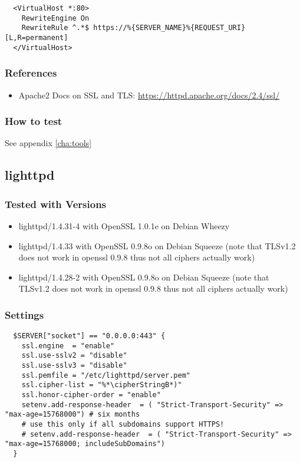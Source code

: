 \begin{lstlisting}
  <VirtualHost *:80>
    RewriteEngine On
    RewriteRule ^.*$ https://%{SERVER_NAME}%{REQUEST_URI} [L,R=permanent]
  </VirtualHost>
\end{lstlisting}

\subsubsection{References}
\begin{itemize}
  \item Apache2 Docs on SSL and TLS: \url{https://httpd.apache.org/docs/2.4/ssl/}
\end{itemize}

\subsubsection{How to test}

See appendix \ref{cha:tools}

\subsection{lighttpd}


\subsubsection{Tested with Versions}
\begin{itemize}
  \item lighttpd/1.4.31-4 with OpenSSL 1.0.1e on Debian Wheezy
  \item lighttpd/1.4.33 with OpenSSL 0.9.8o on Debian Squeeze (note that TLSv1.2 does not work in openssl 0.9.8 thus not all ciphers actually work)
  \item lighttpd/1.4.28-2 with OpenSSL 0.9.8o on Debian Squeeze (note that TLSv1.2 does not work in openssl 0.9.8 thus not all ciphers actually work)
\end{itemize}


\subsubsection{Settings}
\begin{lstlisting}
  $SERVER["socket"] == "0.0.0.0:443" {
    ssl.engine  = "enable"
    ssl.use-sslv2 = "disable"
    ssl.use-sslv3 = "disable"
    ssl.pemfile = "/etc/lighttpd/server.pem"
    ssl.cipher-list = "%*\cipherStringB*)"
    ssl.honor-cipher-order = "enable"
    setenv.add-response-header  = ( "Strict-Transport-Security" => "max-age=15768000") # six months
    # use this only if all subdomains support HTTPS!
    # setenv.add-response-header  = ( "Strict-Transport-Security" => "max-age=15768000; includeSubDomains")
  }
\end{lstlisting}


